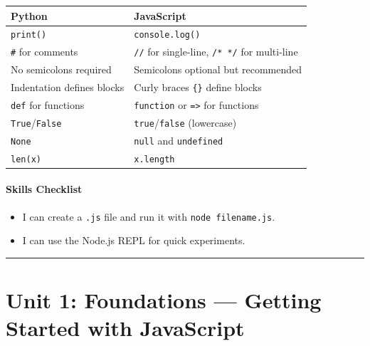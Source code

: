 \documentclass[
  justified,
  openright,
]{tufte-book}
\let\subsubsection\paragraph
\let\paragraph\paragraph
\let\subsubsection\paragraph
\let\paragraph\paragraph
\providecommand{\tightlist}{%
  \setlength{\itemsep}{0pt}\setlength{\parskip}{0pt}}
\begin{document}
{\def\LTcaptype{none} %
\begin{longtable}[]{@{}
  >{\raggedright\arraybackslash}p{}
  >{\raggedright\arraybackslash}p{}@{}}
\toprule\noalign{}
\begin{minipage}[b]{\linewidth}\raggedright
Python
\end{minipage} & \begin{minipage}[b]{\linewidth}\raggedright
JavaScript
\end{minipage} \\
\midrule\noalign{}
\endhead
\bottomrule\noalign{}
\endlastfoot
\texttt{print()} & \texttt{console.log()} \\
\texttt{\#} for comments & \texttt{//} for single-line, \texttt{/*\ */}
for multi-line \\
No semicolons required & Semicolons optional but recommended \\
Indentation defines blocks & Curly braces \texttt{\{\}} define blocks \\
\texttt{def} for functions & \texttt{function} or
\texttt{=\textgreater{}} for functions \\
\texttt{True}/\texttt{False} & \texttt{true}/\texttt{false}
(lowercase) \\
\texttt{None} & \texttt{null} and \texttt{undefined} \\
\texttt{len(x)} & \texttt{x.length} \\
\end{longtable}
}

\subsubsection{Skills Checklist}\label{skills-checklist-1}

\begin{itemize}
\tightlist
\item[$\square$]
  I can create a \texttt{.js} file and run it with
  \texttt{node\ filename.js}.
\item[$\square$]
  I can use the Node.js REPL for quick experiments.
\end{itemize}

\begin{center}\rule{0.5\linewidth}{0.5pt}\end{center}

\section{Unit 1: Foundations --- Getting Started with
JavaScript}\label{unit-1-foundations-getting-started-with-javascript}
\end{document}
